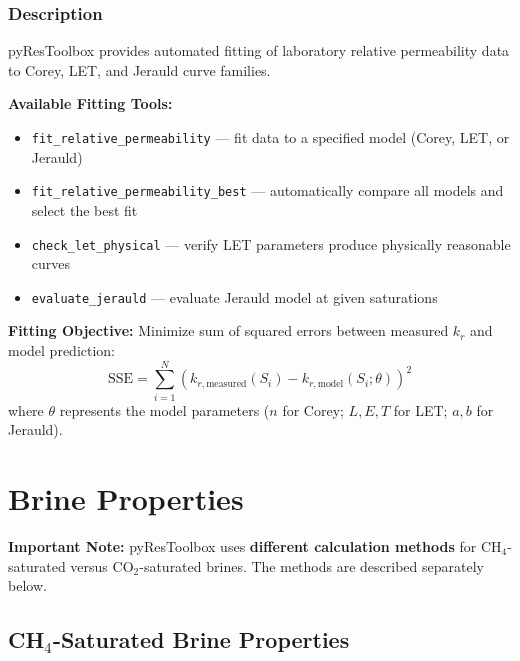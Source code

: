 \documentclass[11pt,a4paper]{article}
\begin{document}
\subsubsection{Description}
pyResToolbox provides automated fitting of laboratory relative permeability data to Corey, LET, and Jerauld curve families.

\begin{tcolorbox}[colback=formulabox,colframe=black!75]
\textbf{Available Fitting Tools:}
\begin{itemize}
\item \texttt{fit\_relative\_permeability} --- fit data to a specified model (Corey, LET, or Jerauld)
\item \texttt{fit\_relative\_permeability\_best} --- automatically compare all models and select the best fit
\item \texttt{check\_let\_physical} --- verify LET parameters produce physically reasonable curves
\item \texttt{evaluate\_jerauld} --- evaluate Jerauld model at given saturations
\end{itemize}

\textbf{Fitting Objective:} Minimize sum of squared errors between measured $k_r$ and model prediction:
\begin{equation}
\text{SSE} = \sum_{i=1}^{N} \left( k_{r,\text{measured}}(S_i) - k_{r,\text{model}}(S_i; \theta) \right)^2
\end{equation}
where $\theta$ represents the model parameters ($n$ for Corey; $L,E,T$ for LET; $a,b$ for Jerauld).
\end{tcolorbox}

\newpage

\section{Brine Properties}

\textbf{Important Note:} pyResToolbox uses \textbf{different calculation methods} for CH$_4$-saturated versus CO$_2$-saturated brines. The methods are described separately below.

\subsection{CH$_4$-Saturated Brine Properties}
\end{document}
